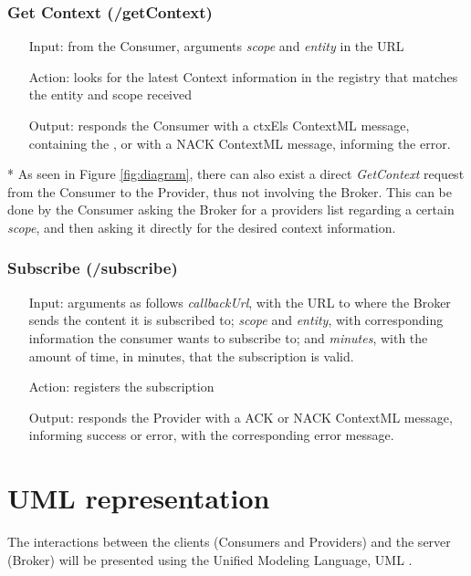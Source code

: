 \subsubsection{Get Context (/getContext)}
\begin{itemize}
	\item[Input:] from the Consumer, arguments \textit{scope} and \textit{entity} in the URL
	
	\item[Action:] looks for the latest Context information in the registry that matches the entity and scope received
	
	\item[Output:] responds the Consumer with a ctxEls ContextML message, containing the , or with a NACK ContextML message, informing the error.
	
\end{itemize}
* As seen in Figure \ref{fig:diagram}, there can also exist a direct \textit{GetContext} request from the Consumer to the Provider, thus not involving the Broker. This can be done by the Consumer asking the Broker for a providers list regarding a certain \textit{scope}, and then asking it directly for the desired context information. 

\subsubsection{Subscribe (/subscribe)}
\begin{itemize}
	\item[Input:] arguments as follows \textit{callbackUrl}, with the URL to where the Broker sends the content it is subscribed to; \textit{scope} and \textit{entity}, with corresponding information the consumer wants to subscribe to; and \textit{minutes}, with the amount of time, in minutes, that the subscription is valid.
	
	\item[Action:] registers the subscription
	
	\item[Output:] responds the Provider with a ACK or NACK ContextML message, informing success or error, with the corresponding error message.
\end{itemize}

\section{UML representation}
The interactions between the clients (Consumers and Providers) and the server (Broker) will be presented using the Unified Modeling Language, UML \cite{uml}.

